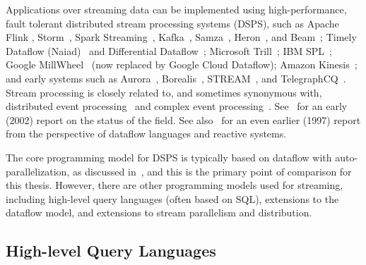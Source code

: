 Applications over streaming data can be implemented using
high-performance, fault tolerant distributed stream processing systems (DSPS), such as
Apache
Flink \cite{Flink2015,Flink2017,Flink},
Storm~\cite{Storm},
Spark Streaming~\cite{Spark2013,SparkStreaming},
Kafka~\cite{garg2013apache},
Samza~\cite{Samza2017},
Heron~\cite{kulkarni2015twitter-heron,Heron},
and Beam~\cite{Beam};
Timely Dataflow (Naiad)~\cite{Naiad2013,Timely}
and
Differential Dataflow~\cite{mcsherry2013differential};
Microsoft
Trill~\cite{chandramouli2014trill};
IBM SPL~\cite{HAG2013SPL};
Google MillWheel~\cite{MillWheel} (now replaced by Google Cloud Dataflow);
Amazon Kinesis~\cite{AmazonKinesis};
and early systems such as
Aurora~\cite{Aurora,AuroraWeb},
Borealis~\cite{Borealis,BorealisWeb},
STREAM~\cite{STREAM2004},
and TelegraphCQ~\cite{Telegraph}.
Stream processing is closely related to,
and sometimes synonymous with,
distributed event processing~\cite{DEBS2006}
and complex event processing~\cite{CEP2006}.
See~\cite{babcock2002models} for an early (2002) report on the status of the field.
See also~\cite{stephens1997survey} for an even earlier (1997) report from the perspective of dataflow languages and reactive systems.

The core programming model for DSPS is typically based on dataflow with auto-parallelization, as discussed in~,
and this is the primary point of comparison for this thesis.
However, there are other programming models used for streaming, including
high-level query languages (often based on SQL),
extensions to the dataflow model,
and extensions to stream parallelism and distribution.

\subsection{High-level Query Languages}

